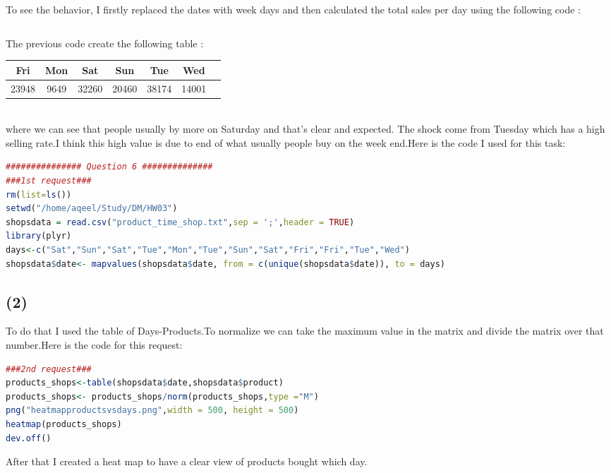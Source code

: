 \documentclass{article}
\begin{document}
		\begin{flushleft}

To see the behavior, I firstly replaced the dates with week days and then calculated the total sales per day using the following code :
\begin{lstlisting}[language=R]
\end{lstlisting}
The previous code create the following table : \\
\begin{tabular}{|c|c|c|c|c|c|c|}
	\hline
Fri&Mon&Sat&Sun&Tue&Wed\\
\hline
23948&9649&32260&20460&38174&14001\\
\hline
\end{tabular}\\
where we can see that people usually by more on Saturday and that's clear and expected. The shock come from Tuesday which has a high selling rate.I think this high value is due to end of what usually people buy on the week end.Here is the code I used for this task:
\begin{lstlisting}[language=R]
############### Question 6 ##############
###1st request###
rm(list=ls())
setwd("/home/aqeel/Study/DM/HW03")
shopsdata = read.csv("product_time_shop.txt",sep = ';',header = TRUE)
library(plyr)
days<-c("Sat","Sun","Sat","Tue","Mon","Tue","Sun","Sat","Fri","Fri","Tue","Wed")
shopsdata$date<- mapvalues(shopsdata$date, from = c(unique(shopsdata$date)), to = days)
\end{lstlisting}
\end{flushleft}
		{\centering \subsection*{(2)}}
To do that I used the table of Days-Products.To normalize we can take the maximum value in the matrix and divide the matrix over that number.Here is the code for this request:
\begin{lstlisting}[language=R]
###2nd request###
products_shops<-table(shopsdata$date,shopsdata$product)
products_shops<- products_shops/norm(products_shops,type ="M")
png("heatmapproductsvsdays.png",width = 500, height = 500)
heatmap(products_shops)
dev.off()
\end{lstlisting}
After that I created a heat map to have a clear view of products bought which day.
\end{document}
